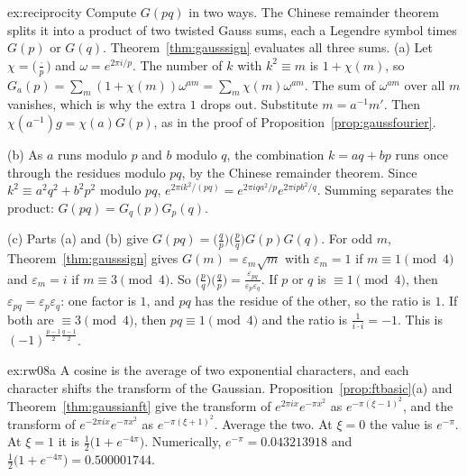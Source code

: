 \begin{solution}{ex:reciprocity}
\idea Compute $G(pq)$ in two ways. The Chinese remainder theorem splits it into a product of two twisted Gauss sums, each a Legendre symbol times $G(p)$ or $G(q)$. Theorem~\ref{thm:gausssign} evaluates all three sums.
\writeup (a) Let $\chi=\bigl(\frac\cdot p\bigr)$ and $\omega=e^{2\pi i/p}$. The number of $k$ with $k^2\equiv m$ is $1+\chi(m)$, so $G_a(p)=\sum_m(1+\chi(m))\omega^{am}=\sum_m\chi(m)\omega^{am}$. The sum of $\omega^{am}$ over all $m$ vanishes, which is why the extra $1$ drops out. Substitute $m=a^{-1}m'$. Then $\chi(a^{-1})g=\chi(a)G(p)$, as in the proof of Proposition~\ref{prop:gaussfourier}.

(b) As $a$ runs modulo $p$ and $b$ modulo $q$, the combination $k=aq+bp$ runs once through the residues modulo $pq$, by the Chinese remainder theorem. Since $k^2\equiv a^2q^2+b^2p^2$ modulo $pq$, $e^{2\pi ik^2/(pq)}=e^{2\pi iqa^2/p}e^{2\pi ipb^2/q}$. Summing separates the product: $G(pq)=G_q(p)G_p(q)$.

(c) Parts (a) and (b) give $G(pq)=\bigl(\frac qp\bigr)\bigl(\frac pq\bigr)G(p)G(q)$. For odd $m$, Theorem~\ref{thm:gausssign} gives $G(m)=\varepsilon_m\sqrt m$ with $\varepsilon_m=1$ if $m\equiv1\pmod4$ and $\varepsilon_m=i$ if $m\equiv3\pmod4$. So $\bigl(\frac pq\bigr)\bigl(\frac qp\bigr)=\frac{\varepsilon_{pq}}{\varepsilon_p\varepsilon_q}$. If $p$ or $q$ is $\equiv1\pmod4$, then $\varepsilon_{pq}=\varepsilon_p\varepsilon_q$: one factor is $1$, and $pq$ has the residue of the other, so the ratio is $1$. If both are $\equiv3\pmod4$, then $pq\equiv1\pmod4$ and the ratio is $\frac1{i\cdot i}=-1$. This is $(-1)^{\frac{p-1}2\frac{q-1}2}$.
\end{solution}

\begin{solution}{ex:rw08a}
\idea A cosine is the average of two exponential characters, and each character shifts the transform of the Gaussian.
\writeup Proposition~\ref{prop:ftbasic}(a) and Theorem~\ref{thm:gaussianft} give the transform of $e^{2\pi ix}e^{-\pi x^2}$ as $e^{-\pi(\xi-1)^2}$, and the transform of $e^{-2\pi ix}e^{-\pi x^2}$ as $e^{-\pi(\xi+1)^2}$. Average the two. At $\xi=0$ the value is $e^{-\pi}$. At $\xi=1$ it is $\frac12\bigl(1+e^{-4\pi}\bigr)$. Numerically, $e^{-\pi}=0.043213918$ and $\frac12\bigl(1+e^{-4\pi}\bigr)=0.500001744$.
\end{solution}

